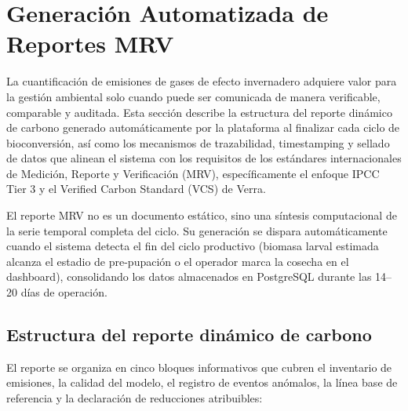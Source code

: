 \section{Generación Automatizada de Reportes MRV}
\label{sec:cap5_mrv}

La cuantificación de emisiones de gases de efecto invernadero adquiere valor para la gestión ambiental solo cuando puede ser comunicada de manera verificable, comparable y auditada. Esta sección describe la estructura del reporte dinámico de carbono generado automáticamente por la plataforma al finalizar cada ciclo de bioconversión, así como los mecanismos de trazabilidad, timestamping y sellado de datos que alinean el sistema con los requisitos de los estándares internacionales de Medición, Reporte y Verificación (MRV), específicamente el enfoque IPCC Tier 3 y el Verified Carbon Standard (VCS) de Verra.

El reporte MRV no es un documento estático, sino una síntesis computacional de la serie temporal completa del ciclo. Su generación se dispara automáticamente cuando el sistema detecta el fin del ciclo productivo (biomasa larval estimada alcanza el estadio de pre-pupación o el operador marca la cosecha en el dashboard), consolidando los datos almacenados en PostgreSQL durante las 14--20 días de operación.

\subsection{Estructura del reporte dinámico de carbono}
\label{subsec:cap5_estructura_reporte}

El reporte se organiza en cinco bloques informativos que cubren el inventario de emisiones, la calidad del modelo, el registro de eventos anómalos, la línea base de referencia y la declaración de reducciones atribuibles:

